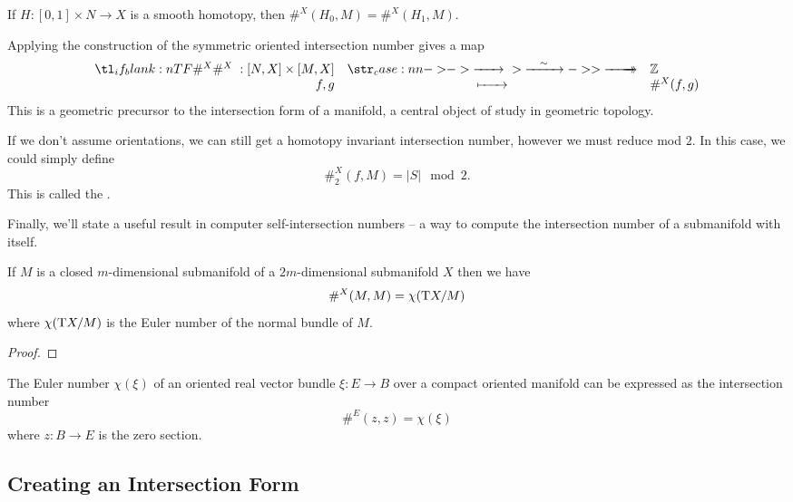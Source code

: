\begin{corollary}
	If $H : [0,1]\times N \to X$ is a smooth homotopy, then $\#^X(H_0, M) = \#^X(H_1, M)$.
\end{corollary}

Applying the construction of the symmetric oriented intersection number gives a map
\begin{equation}\label{eq:oriented-intersection-number-homotopy}
	\lkxfunc{\#^X}{[N,X]\times [M,X]}{\Z}{f,g}{\#^X(f,g)}
\end{equation}
This is a geometric precursor to the intersection form of a manifold, a central object of study in geometric topology.

\begin{remark}
	If we don't assume orientations, we can still get a homotopy invariant intersection number, however we must reduce mod $2$. In this case, we could simply define
	\[
		\#_2^X(f,M) = |S|\mod 2.
	\]
	This is called the .
\end{remark}

Finally, we'll state a useful result in computer self-intersection numbers -- a way to compute the intersection number of a submanifold with itself.

\begin{theorem}\label{thm:euler-number-self-intersection}
	If $M$ is a closed $m$-dimensional submanifold of a $2m$-dimensional submanifold $X$ then we have
	\[
		\#^X(M, M) = \chi(\mathrm{T} X/M)
	\]
	where $\chi(\mathrm{T} X/M)$ is the Euler number of the normal bundle of $M$.
\end{theorem}
\begin{proof}
\end{proof}

\begin{corollary}\label{thm:euler-number-self-intersection-corollary}
	The Euler number $\chi(\xi)$ of an oriented real vector bundle $\xi : E \to B$ over a compact oriented manifold can be expressed as the intersection number
	\[
		\#^E(z,z) = \chi(\xi)
	\]
	where $z : B \to E$ is the zero section.
\end{corollary}


\subsection{Creating an Intersection Form}

